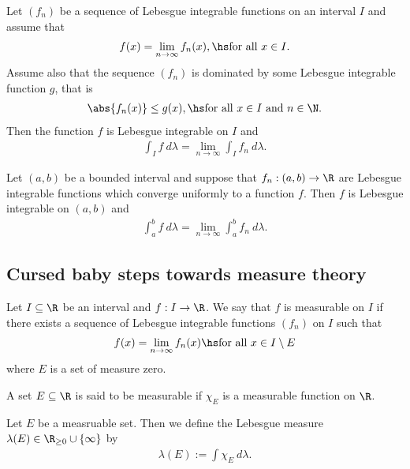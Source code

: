 \documentclass{article}
\begin{document}
\begin{theorem}
	Let $(f_n)$ be a sequence of Lebesgue integrable functions on an interval $I$ and assume that
	\begin{align*}
		f(x) = \lim_{n\to\infty} f_n(x), \hs \text{for all $x\in I$}.
	\end{align*}
	Assume also that the sequence $(f_n)$ is dominated by some Lebesgue integrable function $g$, that is
	\begin{align*}
		\abs{f_n(x)} \leq g(x), \hs \text{for all $x\in I$ and $n\in\N$.}
	\end{align*}
	Then the function $f$ is Lebesgue integrable on $I$ and
	\begin{align*}
		\int_I f\:d\lambda= \lim_{n\to\infty} \int_I f_n\:d\lambda.
	\end{align*}
\end{theorem}

\begin{theorem}[Notes 4.13]
	Let $(a,b)$ be a bounded interval and suppose that $f_n:(a,b)\to\R$ are Lebesgue integrable functions
	which converge uniformly to a function $f$. Then $f$ is Lebesgue integrable on $(a,b)$ and
	\begin{align*}
		\int_a^b f\:d\lambda= \lim_{n\to\infty} \int_a^b f_n\:d\lambda.
	\end{align*}
\end{theorem}

\subsection{Cursed baby steps towards measure theory}

\begin{definition}
	Let $I\subseteq\R$ be an interval and $f:I\to\R$. We say that $f$ is measurable on $I$ if
	there exists a sequence of Lebesgue integrable functions $(f_n)$ on $I$ such that
	\begin{align*}
		f(x)=\lim_{n\to\infty} f_n(x) \hs\text{for all $x\in I\setminus E$}
	\end{align*}
	where $E$ is a set of measure zero.

	A set $E\subseteq\R$ is said to be measurable if $\chi_E$ is a measurable function
	on $\R$.
\end{definition}

\begin{definition}
	Let $E$ be a measruable set. Then we define the Lebesgue measure $\lambda(E)\in\R_{\geq 0}\cup\{\infty\}$ by
	\begin{align*}
		\lambda(E) := \int \chi_E\:d\lambda.
	\end{align*}
\end{definition}
\end{document}
